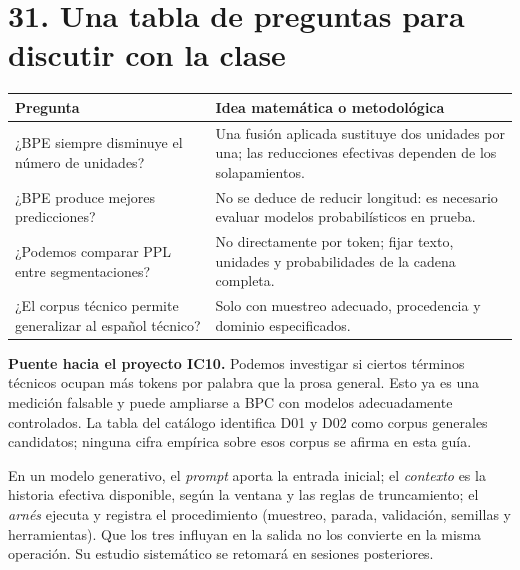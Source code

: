 \section*{31. Una tabla de preguntas para discutir con la clase}
\begin{center}
\begin{tabularx}{\textwidth}{p{55mm}X}\toprule
Pregunta & Idea matemática o metodológica\\\midrule
¿BPE siempre disminuye el número de unidades? & Una fusión aplicada sustituye dos unidades por una; las reducciones efectivas dependen de los solapamientos.\\
¿BPE produce mejores predicciones? & No se deduce de reducir longitud: es necesario evaluar modelos probabilísticos en prueba.\\
¿Podemos comparar PPL entre segmentaciones? & No directamente por token; fijar texto, unidades y probabilidades de la cadena completa.\\
¿El corpus técnico permite generalizar al español técnico? & Solo con muestreo adecuado, procedencia y dominio especificados.\\\bottomrule
\end{tabularx}
\end{center}
\textbf{Puente hacia el proyecto IC10.} Podemos investigar si ciertos términos técnicos ocupan más tokens por palabra que la prosa general. Esto ya es una medición falsable y puede ampliarse a BPC con modelos adecuadamente controlados. La tabla del catálogo identifica D01 y D02 como corpus generales candidatos; ninguna cifra empírica sobre esos corpus se afirma en esta guía.
\begin{idea}
En un modelo generativo, el \emph{prompt} aporta la entrada inicial; el \emph{contexto} es la historia efectiva disponible, según la ventana y las reglas de truncamiento; el \emph{arnés} ejecuta y registra el procedimiento (muestreo, parada, validación, semillas y herramientas). Que los tres influyan en la salida no los convierte en la misma operación. Su estudio sistemático se retomará en sesiones posteriores.
\end{idea}
\clearpage
